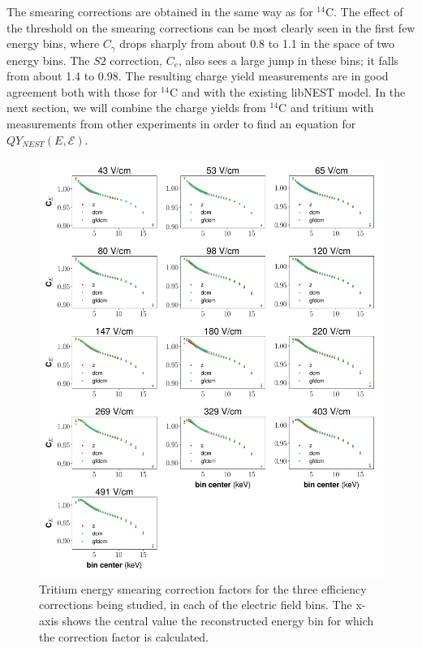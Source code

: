 The smearing corrections are obtained in the same way as for $^{14}$C. The effect of the threshold on the smearing corrections can be most clearly seen in the first few energy bins, where $C_{\gamma}$ drops sharply from about 0.8 to 1.1 in the space of two energy bins. The $S2$ correction, $C_{e}$, also sees a large jump in these bins; it falls from about 1.4 to 0.98. The resulting charge yield measurements are in good agreement both with those for $^{14}$C and with the existing libNEST model. In the next section, we will combine the charge yields from $^{14}$C and tritium with measurements from other experiments in order to find an equation for $QY_{NEST}(E,\mathcal{E})$.

\begin{figure}[h!]
\centering
\includegraphics[width=\textwidth]{Figures/H3_C_Energy_prelim.pdf}
\caption{Tritium energy smearing correction factors for the three efficiency corrections being studied, in each of the electric field bins. The x-axis shows the central value the reconstructed energy bin for which the correction factor is calculated.}
\label{fig:H3_CE_prelim}
\end{figure}
